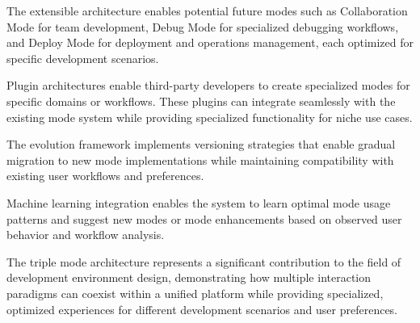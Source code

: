 \begin{infobox}[title=Future Mode Possibilities]
The extensible architecture enables potential future modes such as Collaboration Mode for team development, Debug Mode for specialized debugging workflows, and Deploy Mode for deployment and operations management, each optimized for specific development scenarios.
\end{infobox}

Plugin architectures enable third-party developers to create specialized modes for specific domains or workflows. These plugins can integrate seamlessly with the existing mode system while providing specialized functionality for niche use cases.

The evolution framework implements versioning strategies that enable gradual migration to new mode implementations while maintaining compatibility with existing user workflows and preferences.

Machine learning integration enables the system to learn optimal mode usage patterns and suggest new modes or mode enhancements based on observed user behavior and workflow analysis.

The triple mode architecture represents a significant contribution to the field of development environment design, demonstrating how multiple interaction paradigms can coexist within a unified platform while providing specialized, optimized experiences for different development scenarios and user preferences.
